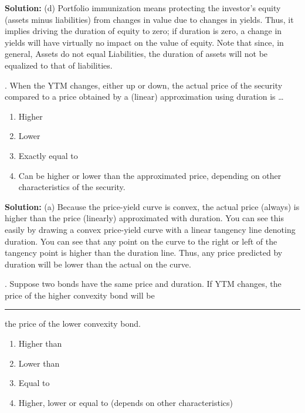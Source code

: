 \documentclass[11.5pt]{article}
\begin{document}
\noindent \textbf{Solution:} (d) Portfolio immunization means protecting the investor’s equity (assets minus liabilities) from changes in value due to changes in yields. Thus, it implies driving the duration of equity to zero; if duration is zero, a change in yields will have virtually no impact on the value of equity. Note that since, in general, Assets do not equal Liabilities, the duration of assets will not be equalized to that of liabilities.

\vspace{30pt}




. When the YTM changes, either up or down, the actual price of the security compared to a price obtained by a (linear) approximation using duration is …


\begin{enumerate}[a]
	
	\item Higher
	
	\item Lower
	
	\item Exactly equal to
	
	\item Can be higher or lower than the approximated price, depending on other characteristics of the security.
\end{enumerate}


\noindent \textbf{Solution:} (a) Because the price-yield curve is convex, the actual price (always) is higher than the price (linearly) approximated with duration. You can see this easily by drawing a convex price-yield curve with a linear tangency line denoting duration. You can see that any point on the curve to the right or left of the tangency point is higher than the duration line. Thus, any price predicted by duration will be lower than the actual on the curve.



\vspace{30pt}


\newpage


. Suppose two bonds have the same price and duration. If YTM changes, the price of the higher convexity bond will be \rule{1cm}{0.15mm} the price of the lower convexity bond.


\begin{enumerate}[a]
	
	\item Higher than
	
	\item Lower than
	
	\item Equal to
	
	\item Higher, lower or equal to (depends on other characteristics)
\end{enumerate}
\end{document}
